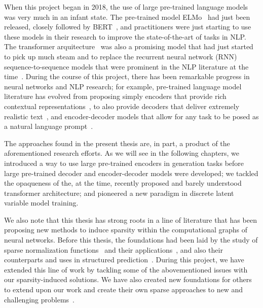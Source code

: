 When this project began in 2018, the use of large pre-trained
language models was very much in an infant state. The
pre-trained model ELMo~\citep{peters2018deep} had just been released,
closely followed by BERT~\citep{devlin2018bert}, and practitioners
were just starting to use these models in their research to improve
the state-of-the-art of tasks in NLP. The transformer
arquitecture~\citep{vaswani2017attention} was also a promising model
that had just started to pick up much steam and to replace the
recurrent neural network (RNN) sequence-to-sequence models that were
prominent in the NLP literature at the
time~\citep{bahdanau2014neural}. During the course of this project,
there has been remarkable progress in neural networks and NLP
research; for example, pre-trained language model literature has
evolved from proposing simply encoders that provide rich contextual
representations~\citep[\eg, ELMo and BERT;][]{peters2018deep,
    devlin2018bert}, to also provide decoders that deliver extremely
realistic text~\citep[\eg, GPT-3;][]{brown2020language}, and
encoder-decoder models that allow for any task to be posed as a
natural language prompt~\citep[\eg, T5 and
    BART;][]{raffel2020Exploringlimitstransfer,lewis2020BARTDenoisingSequencetoSequence}.

The approaches found in the present thesis are, in part, a product of
the aforementioned research efforts. As we will see in the following
chapters, we introduced a way to use large pre-trained encoders in
generation tasks before large pre-trained decoder and encoder-decoder
models were developed; we tackled the opaqueness of the, at the time,
recently proposed and barely understood transformer architecture; and
pioneered a new paradigm in discrete latent variable model training.

We also note that this thesis has strong roots in a line of
literature that has been proposing new methods to induce sparsity
within the computational graphs of neural networks. Before this
thesis, the foundations had been laid by the study of sparse
normalization functions~\citep{sparsemax,fusedmax,entmax} and their
applications~\citep{maruf2019selective,malaviya2018sparse}, and also
their counterparts and uses in structured prediction~\citep{sparsemap,sparsemapcg}.
During this project, we have extended this line of work by tackling
some of the abovementioned issues with our sparsity-induced
solutions. We have also created new foundations for others to extend
upon our work and create their own sparse approaches to new and
challenging problems~\citep{treviso2021PredictingAttentionSparsity,
    farinhas2022SparseCommunicationMixed}.





\cleardoublepage
\singlespacing
